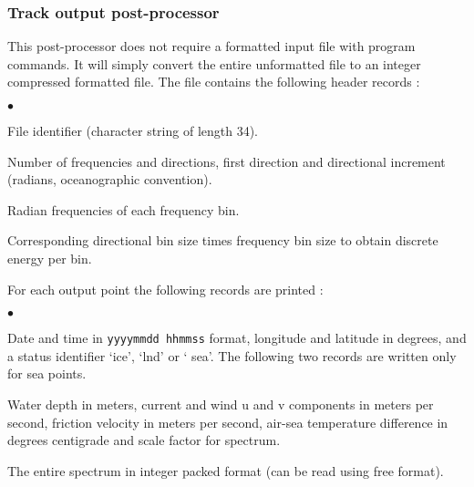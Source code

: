 \pb
\vsssub
\subsubsection{Track output post-processor} \label{sec:post_t}
\vsssub


\vspace{\baselineskip} 
\noindent
This post-processor does not require a formatted input file with program
commands. It will simply convert the entire unformatted file to an integer
compressed formatted file. The file contains the following header records :

\begin{list}{$\bullet$}{\itemsep 0mm \parsep 0mm}
\item File identifier (character string of length 34).
\item Number of frequencies and directions, first direction and directional
      increment (radians, oceanographic convention).
\item Radian frequencies of each frequency bin.
\item Corresponding directional bin size times frequency bin size to obtain
      discrete energy per bin.
\end{list}

\noindent
For each output point the following records are printed :
\begin{list}{$\bullet$}{\itemsep 0mm \parsep 0mm}
\item Date and time in {\tt yyyymmdd hhmmss} format, longitude and latitude in
      degrees, and a status identifier `{\F ice}', `{\F lnd}' or `{\F
      sea}'. The following two records are written only for sea points.
\item Water depth in meters, current and wind u and v components in meters per
      second, friction velocity in meters per second, air-sea temperature
      difference in degrees centigrade and scale factor for spectrum.
\item The entire spectrum in integer packed format (can be read using free
      format).
\end{list}


\pb
\vsssub
